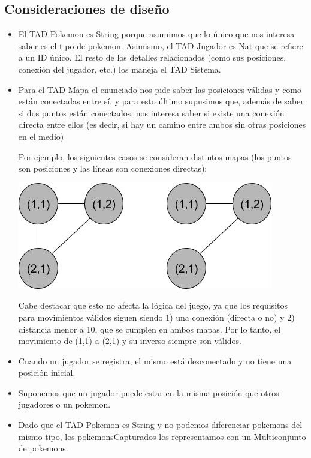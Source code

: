 \renewcommand{\labelitemi}{\textbullet}

\subsection{Consideraciones de diseño}
\begin{itemize}

	\item El TAD Pokemon es String porque asumimos que lo único que nos interesa saber es el tipo de pokemon. Asimismo, el TAD Jugador es Nat que se refiere a un ID único. El resto de los detalles relacionados (como sus posiciones, conexión del jugador, etc.) los maneja el TAD Sistema.

	\item Para el TAD Mapa el enunciado nos pide saber las posiciones válidas y como están conectadas entre sí, y para esto último supusimos que, además de saber si dos puntos están conectados, nos interesa saber si existe una conexión directa entre ellos (es decir, si hay un camino entre ambos sin otras posiciones en el medio)

	Por ejemplo, los siguientes casos se consideran distintos mapas (los puntos son posiciones y las líneas son conexiones directas):

	\bigskip
	\centerline{\includegraphics[scale=0.5]{nodos-mapa.png}}

	Cabe destacar que esto no afecta la lógica del juego, ya que los requisitos para movimientos válidos siguen siendo 1) una conexión (directa o no) y 2) distancia menor a 10, que se cumplen en ambos mapas. Por lo tanto, el movimiento de (1,1) a (2,1) y su inverso siempre son válidos.

	\item Cuando un jugador se registra, el mismo está desconectado y no tiene una posición inicial.

	\item Suponemos que un jugador puede estar en la misma posición que otros jugadores o un pokemon.

	\item Dado que el TAD Pokemon es String y no podemos diferenciar pokemons del mismo tipo, los pokemonsCapturados los representamos con un Multiconjunto de pokemons.


\end{itemize}
